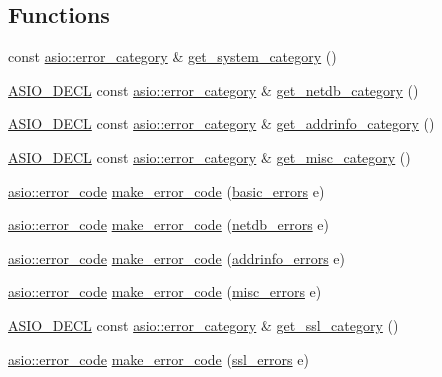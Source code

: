 \subsection*{Functions}
\begin{DoxyCompactItemize}
\item 
const \hyperlink{classasio_1_1error__category}{asio\+::error\+\_\+category} \& \hyperlink{namespaceasio_1_1error_ab830b9c09076398a1b0e72f619eb0204}{get\+\_\+system\+\_\+category} ()
\item 
\hyperlink{config_8hpp_ab54d01ea04afeb9a8b39cfac467656b7}{A\+S\+I\+O\+\_\+\+D\+E\+C\+L} const \hyperlink{classasio_1_1error__category}{asio\+::error\+\_\+category} \& \hyperlink{namespaceasio_1_1error_a1ac89eaed3a7078406f329068a71b8ba}{get\+\_\+netdb\+\_\+category} ()
\item 
\hyperlink{config_8hpp_ab54d01ea04afeb9a8b39cfac467656b7}{A\+S\+I\+O\+\_\+\+D\+E\+C\+L} const \hyperlink{classasio_1_1error__category}{asio\+::error\+\_\+category} \& \hyperlink{namespaceasio_1_1error_a371cb8e6425ed58337e192fe35b4afe9}{get\+\_\+addrinfo\+\_\+category} ()
\item 
\hyperlink{config_8hpp_ab54d01ea04afeb9a8b39cfac467656b7}{A\+S\+I\+O\+\_\+\+D\+E\+C\+L} const \hyperlink{classasio_1_1error__category}{asio\+::error\+\_\+category} \& \hyperlink{namespaceasio_1_1error_a57ab0c3eda415bc1d2c58f93875ff60f}{get\+\_\+misc\+\_\+category} ()
\item 
\hyperlink{classasio_1_1error__code}{asio\+::error\+\_\+code} \hyperlink{namespaceasio_1_1error_a4073e7c990fd629754e5a3c1cfc6078a}{make\+\_\+error\+\_\+code} (\hyperlink{namespaceasio_1_1error_a2a69445eee784059ac2f4a6c4f5fe90d}{basic\+\_\+errors} e)
\item 
\hyperlink{classasio_1_1error__code}{asio\+::error\+\_\+code} \hyperlink{namespaceasio_1_1error_ae490df1c16abd8fd4d414a36b8f9df3e}{make\+\_\+error\+\_\+code} (\hyperlink{namespaceasio_1_1error_aca1d28016f48d8f815c602788bc466de}{netdb\+\_\+errors} e)
\item 
\hyperlink{classasio_1_1error__code}{asio\+::error\+\_\+code} \hyperlink{namespaceasio_1_1error_a983d74ed795fee93a3633b26d8180215}{make\+\_\+error\+\_\+code} (\hyperlink{namespaceasio_1_1error_aad09966951a812a25f9cd9e7d92c2764}{addrinfo\+\_\+errors} e)
\item 
\hyperlink{classasio_1_1error__code}{asio\+::error\+\_\+code} \hyperlink{namespaceasio_1_1error_a88c08b7aff0b95d1a9fa9b2fb89189c7}{make\+\_\+error\+\_\+code} (\hyperlink{namespaceasio_1_1error_ade61a402d1dfb10b1c223906f5ea7847}{misc\+\_\+errors} e)
\item 
\hyperlink{config_8hpp_ab54d01ea04afeb9a8b39cfac467656b7}{A\+S\+I\+O\+\_\+\+D\+E\+C\+L} const \hyperlink{classasio_1_1error__category}{asio\+::error\+\_\+category} \& \hyperlink{namespaceasio_1_1error_a0e204a09e28aaebddc5437232c643ae7}{get\+\_\+ssl\+\_\+category} ()
\item 
\hyperlink{classasio_1_1error__code}{asio\+::error\+\_\+code} \hyperlink{namespaceasio_1_1error_a54b0d76c8bfbadd378a32f66ce7e7ef0}{make\+\_\+error\+\_\+code} (\hyperlink{namespaceasio_1_1error_a2f5ce38329dc0833d602aa313da3df7a}{ssl\+\_\+errors} e)
\end{DoxyCompactItemize}


